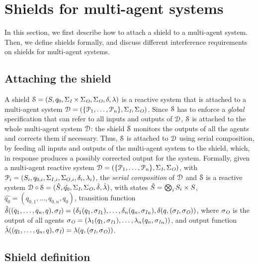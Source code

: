 \section{Shields  for multi-agent systems}
\label{def_shields}

In this section, we first describe how to attach a  shield to a multi-agent system. Then, we define shields formally, and discuss different interference requirements on shields for multi-agent systems.

\subsection{Attaching the shield}

A shield $\mathcal{S} = (S,q_{0},\Sigma_{\textit{I}}\times\Sigma_{\textit{O}},\Sigma_{\textit{O}},\delta,\lambda)$ is a reactive system that is attached to a multi-agent system
$\mathcal{D}=(\{ \mathcal{P}_1,\ldots,\mathcal{P}_n \},\Sigma_{\textit{I}},  \Sigma_{\textit{O}})$.
Since $\mathcal{S}$ has to enforce a \emph{global} specification that can refer to all inputs and outputs of $\mathcal{D}$, $\mathcal{S}$ is attached to the whole multi-agent system $\mathcal{D}$: the shield $\mathcal{S}$ monitors the outputs of all the agents and corrects them if necessary. Thus, $\mathcal{S}$ is attached to $\mathcal{D}$ using serial composition, by feeding  all inputs and outputs of the multi-agent system to the shield, which, in response produces a possibly corrected output for the system.
Formally, given a multi-agent reactive system $\mathcal{D} = (\{ \mathcal{P}_1,\ldots,\mathcal{P}_n \}, \Sigma_{\textit{I}},  \Sigma_{\textit{O}})$, with $\mathcal{P}_i = (S_i, q_{0,i},\Sigma_{I,i},\Sigma_{O,i},\delta_i,\lambda_i)$, the \emph{serial composition} of $\mathcal{D}$ and $\mathcal{S}$ is a reactive system $\mathcal{D} \circ \mathcal{S}=
(\hat{S}, \hat{q_{0}}, \Sigma_{\textit{I}},\Sigma_{\textit{O}}, \hat{\delta},
\hat{\lambda})$, with 
   states $\hat{S} = \bigotimes_i S_i \times S$,
    $\hat{q_{0}} = (q_{0,1},\ldots,q_{0,n},q_{0})$,
   transition function $\hat{\delta}((q_1,\ldots,q_n,q),\sigma_{\textit{I}}) = (\delta_1(q_1,{\sigma_{\textit{I}}}_1),\ldots,\delta_n(q_n,{\sigma_{\textit{I}}}_n), \delta(q,(\sigma_{\textit{I}},\sigma_{\textit{O}}))$, where $\sigma_{\textit{O}}$ is the output of all agents $\sigma_{\textit{O}} = (\lambda_1(q_1,{\sigma_{\textit{I}}}_1),\ldots,\lambda_n(q_n,{\sigma_{\textit{I}}}_n))$, and output function
   $\hat{\lambda}((q_1,\ldots,q_n,q),\sigma_{\textit{I}}) = \lambda(q,(\sigma_{\textit{I}},\sigma_{\textit{O}}))$.



\subsection{Shield definition}\label{sec_correctness_shield}


